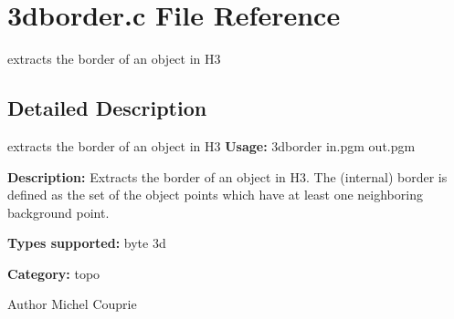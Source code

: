 \section{3dborder.c File Reference}
\label{3dborder_8c}


extracts the border of an object in H3  




\subsection{Detailed Description}
extracts the border of an object in H3 {\bfseries Usage:} 3dborder in.pgm out.pgm

{\bfseries Description:} Extracts the border of an object in H3. The (internal) border is defined as the set of the object points which have at least one neighboring background point.

{\bfseries Types supported:} byte 3d

{\bfseries Category:} topo

\begin{DoxyAuthor}{Author}
Michel Couprie 
\end{DoxyAuthor}
